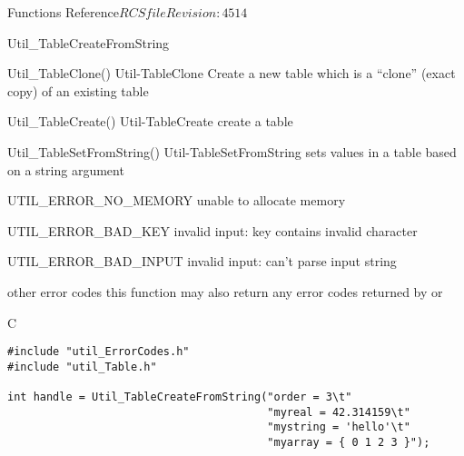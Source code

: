 \begin{cactuspart}{ Functions Reference}{$RCSfile$}{$Revision: 4514 $}
\begin{FunctionDescription}{Util\_TableCreateFromString}
\begin{SeeAlsoSection}
\begin{SeeAlso2} {Util\_TableClone()} {Util-TableClone}
Create a new table which is a ``clone'' (exact copy) of an existing
table
\end{SeeAlso2}
\begin{SeeAlso2} {Util\_TableCreate()} {Util-TableCreate}
create a table
\end{SeeAlso2}
\begin{SeeAlso2} {Util\_TableSetFromString()} {Util-TableSetFromString}
sets values in a table based on a string argument
\end{SeeAlso2}
\end{SeeAlsoSection}

\begin{ErrorSection}
\begin{Error}{UTIL\_ERROR\_NO\_MEMORY}
unable to allocate memory
\end{Error}
\begin{Error}{UTIL\_ERROR\_BAD\_KEY}
invalid input: key contains invalid character
\end{Error}
\begin{Error}{UTIL\_ERROR\_BAD\_INPUT}
invalid input: can't parse input string
\end{Error}
\begin{Error}{\rm other error codes}
this function may also return any error codes returned by
 or 
\end{Error}
\end{ErrorSection}

\begin{ExampleSection}
\begin{Example}{C}
\begin{verbatim}
#include "util_ErrorCodes.h"
#include "util_Table.h"

int handle = Util_TableCreateFromString("order = 3\t"
                                        "myreal = 42.314159\t"
                                        "mystring = 'hello'\t"
                                        "myarray = { 0 1 2 3 }");


\end{verbatim}
\end{Example}
\end{ExampleSection}
\end{FunctionDescription}
\end{cactuspart}
